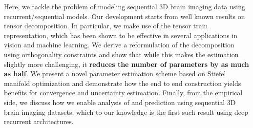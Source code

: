 Here,
we tackle the problem of modeling 
sequential 3D brain imaging data using 
recurrent/sequential models. 
Our development starts from well known results on tensor decomposition. In particular, we 
make use of the tensor train representation, which has been shown to be effective in several 
applications in vision and machine learning. We derive a reformulation of the decomposition using 
orthogonality constraints and show that while this makes the estimation slightly more challenging, 
it {\bf reduces the number of parameters by as much as half}. 
We present a novel parameter estimation scheme based on Stiefel manifold optimization and demonstrate 
how the end to end construction yields benefits for convergence and uncertainty estimation. 
Finally, from the empirical side, we discuss how we enable analysis of and prediction using sequential 3D brain imaging datasets, which to our knowledge is the first such result using 
deep recurrent architectures. 

















